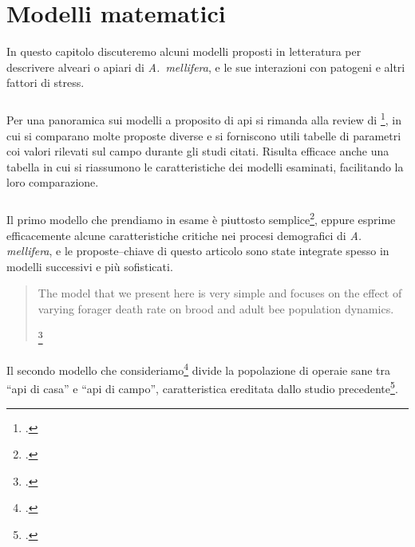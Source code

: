 \chapter{Modelli matematici}
\begin{flushright}
    \small
\end{flushright}

In questo capitolo discuteremo alcuni modelli proposti in letteratura per descrivere alveari o apiari di
\emph{A.~mellifera}, e le sue interazioni con patogeni e altri fattori di stress.

\paragraph{}
Per una panoramica sui modelli a proposito di api si rimanda alla review di
\citeauthor{chen_review}\footcite{chen_review}, in cui si comparano molte proposte diverse e si forniscono utili
tabelle di parametri coi valori rilevati sul campo durante gli studi citati.
Risulta efficace anche una tabella in cui si riassumono le caratteristiche dei modelli esaminati, facilitando
la loro comparazione.

\paragraph{}
Il primo modello che prendiamo in esame è piuttosto semplice\footcite{khoury2011}, eppure esprime efficacemente alcune
caratteristiche critiche nei procesi demografici di \emph{A. mellifera}, e le proposte--chiave di questo
articolo sono state integrate spesso in modelli successivi e più sofisticati.

\blockquote[{\footcite[4]{khoury2011}}]{The model that we present here is very simple and focuses on the effect
of varying forager death rate on brood and adult bee population dynamics.}

\paragraph{}
Il secondo modello che consideriamo\footcite{ratti2017} divide la popolazione di operaie sane tra ``api di casa''
e ``api di campo'', caratteristica ereditata dallo studio precedente\footcite{khoury2011}.

